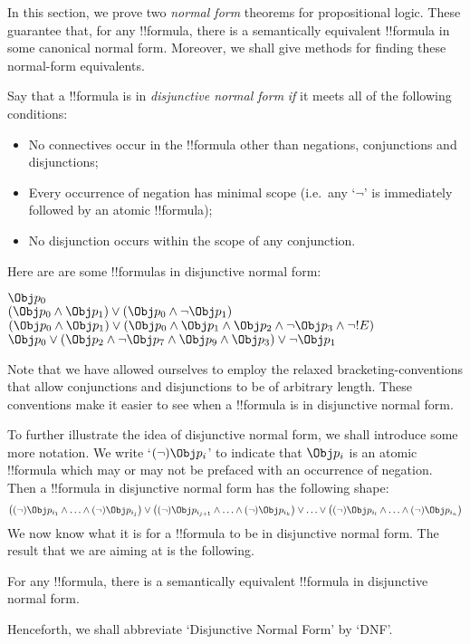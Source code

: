 \documentclass[../../../include/open-logic-section]{subfiles}
\begin{document}


In this section, we prove two \emph{normal form} theorems for propositional logic. These guarantee that, for any !!{formula}, there is a semantically equivalent !!{formula} in some canonical normal form. Moreover, we shall give methods for finding these normal-form equivalents.

Say that a !!{formula} is in \emph{disjunctive normal form} \emph{if} it meets all of the following conditions:
	\begin{itemize}
		\item No connectives occur in the !!{formula} other than negations, conjunctions and disjunctions;
		\item Every occurrence of negation has minimal scope (i.e.\ any `$\lnot$' is immediately followed by an atomic !!{formula});
		\item No disjunction occurs within the scope of any conjunction.
	\end{itemize}
Here are are some !!{formula}s in disjunctive normal form:
	\begin{center}
		$\Obj p_0$\\
		$(\Obj p_0 \land \Obj p_1) \lor (\Obj p_0 \land \lnot \Obj p_1)$\\
		$(\Obj p_0 \land \Obj p_1) \lor (\Obj p_0 \land  \Obj p_1 \land \Obj p_2 \land \lnot \Obj p_3 \land \lnot !E)$\\
		$\Obj p_0 \lor (\Obj p_2 \land \lnot \Obj p_{7} \land \Obj p_{9} \land \Obj p_3) \lor \lnot \Obj p_1$
	\end{center}
Note that we have allowed ourselves to employ the relaxed bracketing-conventions that allow conjunctions and disjunctions to be of arbitrary length. These conventions make it easier to see when a !!{formula} is in disjunctive normal form. 

To further illustrate the idea of disjunctive normal form, we shall introduce some more notation. We write `$(\lnot) \Obj p_i$' to indicate that $\Obj p_i$ is an atomic !!{formula} which may or may not be prefaced with an occurrence of negation. Then a !!{formula} in disjunctive normal form has the following shape:
	$$\bigl((\lnot) {\Obj p_{i_1}} \land \ldots \land (\lnot) {\Obj p_{i_j}}\bigr) \lor \bigl((\lnot) {\Obj p_{i_{j+1}}} \land \ldots \land (\lnot){\Obj p_{i_k}}\bigr) \lor \ldots \lor \bigl((\lnot){\Obj p_{i_{l}}} \land \ldots \land (\lnot) {\Obj p_{i_n}}\bigr)$$
We now know what it is for a !!{formula} to be in disjunctive normal form. The result that we are aiming at is the following.
	\begin{prop}
	For any !!{formula}, there is a semantically equivalent !!{formula} in disjunctive normal form.
	\end{prop}
Henceforth, we shall abbreviate `Disjunctive Normal Form' by `DNF'. 
\end{document}
